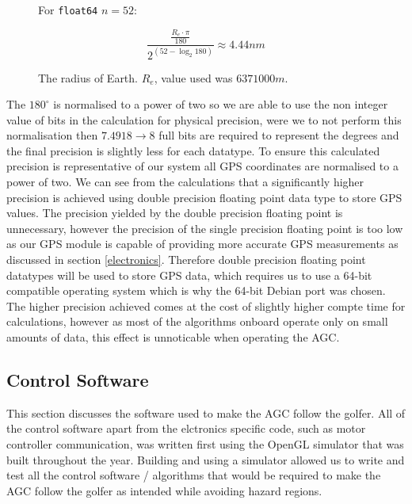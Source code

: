 \documentclass[11pt,landscape]{article}
\begin{document}
\begin{multicols}{3}
\begin{figure}[H]
\begin{mdframed}
\begin{center}
\begin{minipage}{0.45\textwidth}
                    \begin{mdframed}
                For \verb|float64| $n=52$:
                \begin{center}
                    \begin{equation*}
                        \frac{\frac{R_e \cdot \pi}{180}}{2^{\left(52 - \log_2{180}\right)}} \approx 4.44nm
                    \end{equation*}
                \end{center}
            \end{mdframed}
            \end{minipage}
        \end{center}
        \center The radius of Earth. $R_e$, value used was $6371000m$. 
    \end{mdframed} 
    \label{fig:float_calcs}
\end{figure}
The $180^{\circ}$ is normalised to a power of two so we are able to use the non
integer value of bits in the calculation for physical precision, were we to not
perform this normalisation then $7.4918\rightarrow8$ full bits are required to
represent the degrees and the final
precision is slightly less for each datatype. To ensure this calculated
precision is representative of our system all GPS coordinates are normalised to
a power of two. We can see from the calculations that a significantly higher
precision is achieved using double precision floating point data type to store
GPS values. The precision yielded by the double precision floating point is
unnecessary, however the precision of the single precision floating point is too
low as our GPS module is capable of providing more accurate GPS measurements as
discussed in section \ref{electronics}. Therefore double precision floating
point datatypes will be used to store GPS data, which requires us to use a
64-bit compatible operating system which is why the 64-bit Debian port was
chosen. The higher precision achieved comes at the cost of slightly higher
compte time for calculations, however as most of the algorithms onboard operate
only on small amounts of data, this effect is unnoticable when operating the
AGC.

\subsection{Control Software}
\label{control_software}
This section discusses the software used to make the AGC follow the golfer.
All of the control software apart from the elctronics specific code, such as
motor controller communication, was written first using the OpenGL simulator
that was built throughout the year. Building and using a simulator allowed us to 
write and test all the control software / algorithms that would be required to make 
the AGC follow the golfer as intended while avoiding hazard regions.


\end{multicols}
\end{document}
